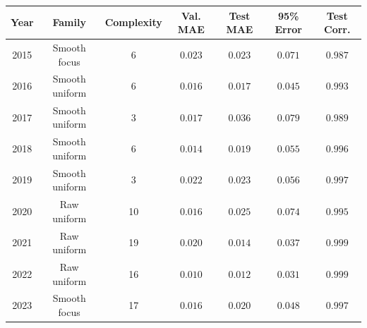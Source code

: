\begingroup
\renewcommand{\arraystretch}{1.14}
\setlength{\tabcolsep}{4.8pt}
\begin{tabular}{@{}ccccccc@{}}
\toprule
Year & Family & Complexity & Val. MAE & Test MAE & 95\% Error & Test Corr. \\
\midrule
2015 & Smooth focus & 6 & $0.023$ & $0.023$ & $0.071$ & $0.987$ \\
2016 & Smooth uniform & 6 & $0.016$ & $0.017$ & $0.045$ & $0.993$ \\
2017 & Smooth uniform & 3 & $0.017$ & $0.036$ & $0.079$ & $0.989$ \\
2018 & Smooth uniform & 6 & $0.014$ & $0.019$ & $0.055$ & $0.996$ \\
2019 & Smooth uniform & 3 & $0.022$ & $0.023$ & $0.056$ & $0.997$ \\
2020 & Raw uniform & 10 & $0.016$ & $0.025$ & $0.074$ & $0.995$ \\
2021 & Raw uniform & 19 & $0.020$ & $0.014$ & $0.037$ & $0.999$ \\
2022 & Raw uniform & 16 & $0.010$ & $0.012$ & $0.031$ & $0.999$ \\
2023 & Smooth focus & 17 & $0.016$ & $0.020$ & $0.048$ & $0.997$ \\
\bottomrule
\end{tabular}
\endgroup
